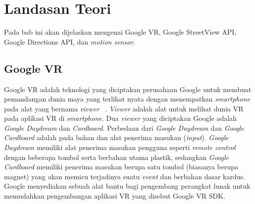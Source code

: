 \chapter{Landasan Teori}
\label{chap:teori}
Pada bab ini akan dijelaskan mengenai Google VR, Google StreetView API, Google Directions API, dan \textit{motion sensor}.

\section{Google VR}
\label{sec:google-vr} 
Google VR adalah teknologi yang diciptakan perusahaan Google untuk membuat pemandangan dunia maya yang terlihat nyata dengan menempatkan \textit{smartphone} pada alat yang bernama \textit{viewer} ~\cite{quickstart-google-vr}. \textit{Viewer} adalah alat untuk melihat dunia VR pada aplikasi VR di \textit{smartphone}. Dua \textit{viewer} yang diciptakan Google adalah \textit{Google Daydream} dan \textit{Cardboard}. Perbedaan dari \textit
{Google Daydream} dan \textit{Google Cardboard} adalah pada bahan dan alat penerima masukan (\textit{input}). \textit{Google Daydream} memiliki alat penerima masukan pengguna seperti \textit{remote control} dengan beberapa tombol serta berbahan utama plastik, sedangkan \textit{Google Cardboard} memiliki penerima masukan berupa satu tombol (biasanya berupa magnet) yang akan memicu terjadinya suatu \textit{event} dan berbahan dasar kardus. Google menyediakan sebuah alat bantu bagi pengembang perangkat lunak untuk memudahkan pengembangan aplikasi VR yang disebut Google VR SDK.

